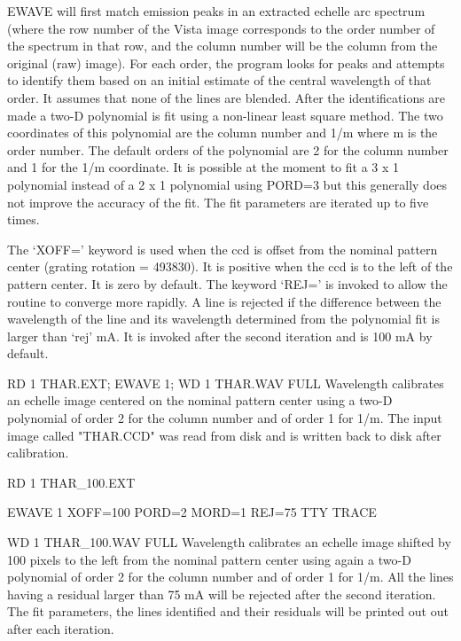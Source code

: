 EWAVE will first match emission peaks in an extracted echelle arc spectrum
(where the row number of the Vista image corresponds to the order number of
the spectrum in that row, and the column number will be the column from the
original (raw) image).  For each order, the program looks for peaks and
attempts to identify them based on an initial estimate of the central
wavelength of that order.  It assumes that none of the lines are blended.
After the identifications are made a two-D polynomial is fit using a
non-linear least square method.  The two coordinates of this polynomial are
the column number and 1/m where m is the order number.  The default orders
of the polynomial are 2 for the column number and 1 for the 1/m coordinate.
It is possible at the moment to fit a 3 x 1 polynomial instead of a 2 x 1
polynomial using PORD=3 but this generally does not improve the accuracy of
the fit.  The fit parameters are iterated up to five times.

The `XOFF=' keyword is used when the ccd is offset from the nominal pattern
center (grating rotation = 493830).  It is positive when the ccd is to the
left of the pattern center.  It is zero by default.  The keyword `REJ=' is
invoked to allow the routine to converge more rapidly.  A line is rejected
if the difference between the wavelength of the line and its wavelength
determined from the polynomial fit is larger than `rej' mA.  It is invoked
after the second iteration and is 100 mA by default.

\begin{example}
  \item[RD 1 THAR.EXT; EWAVE 1; WD 1 THAR.WAV FULL\hfill]{ Wavelength
       calibrates an echelle image centered on the nominal pattern center
       using a two-D polynomial of order 2 for the column number and of
       order 1 for 1/m.  The input image called "THAR.CCD" was read from
       disk and is written back to disk after calibration.}

  \item[RD 1 THAR\_100.EXT\hfill]{}

  \item[EWAVE 1 XOFF=100 PORD=2 MORD=1 REJ=75 TTY TRACE\hfill]{}

  \item[WD 1 THAR\_100.WAV FULL\hfill]{ Wavelength calibrates an echelle
       image shifted by 100 pixels to the left from the nominal pattern
       center using again a two-D polynomial of order 2 for the column
       number and of order 1 for 1/m.  All the lines having a residual
       larger than 75 mA will be rejected after the second iteration.  The
       fit parameters, the lines identified and their residuals will be
       printed out out after each iteration.}
\end{example}


